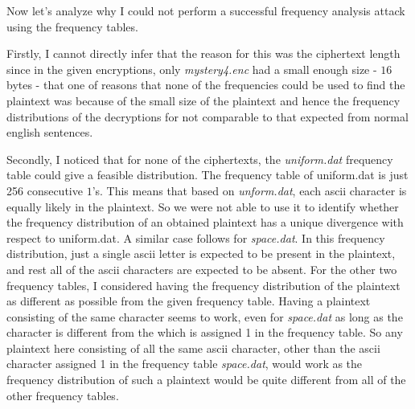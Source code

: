 \documentclass{ashoka-crypto}
\begin{document}
Now let's analyze why I could not perform a successful frequency analysis attack using the frequency tables.

Firstly, I cannot directly infer that the reason for this was the ciphertext length since in the given encryptions, only \textit{mystery4.enc} had a small enough size - $16$ bytes - that one of reasons that none of the frequencies could be used to find the plaintext was because of the small size of the plaintext and hence the frequency distributions of the decryptions for not comparable to that expected from normal english sentences.

Secondly, I noticed that for none of the ciphertexts, the \textit{uniform.dat} frequency table could give a feasible distribution. The frequency table of uniform.dat is just 256 consecutive $1$'s. This means that based on \textit{unform.dat}, each ascii character is equally likely in the plaintext. So we were not able to use it to identify whether the frequency distribution of an obtained plaintext has a unique divergence with respect to uniform.dat. A similar case follows for \textit{space.dat}. In this frequency distribution, just a single ascii letter is expected to be present in the plaintext, and rest all of the ascii characters are expected to be absent. For the other two frequency tables, I considered having the frequency distribution of the plaintext as different as possible from the given frequency table. Having a plaintext consisting of the same character seems to work, even for \textit{space.dat} as long as the character is different from the which is assigned 1 in the frequency table. So any plaintext here consisting of all the same ascii character, other than the ascii character assigned 1 in the frequency table \textit{space.dat}, would work as the frequency distribution of such a plaintext would be quite different from all of the other frequency tables.
\end{document}
